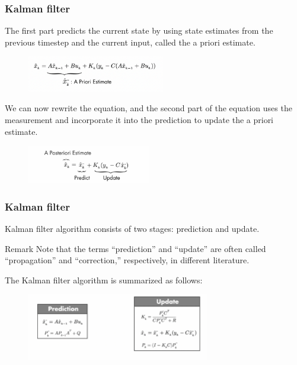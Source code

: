 \documentclass{beamer}
\begin{document}
\begin{frame}
	\frametitle{Kalman filter}
	The first part predicts the current state by using state estimates from the previous timestep and the current input, called the a priori estimate.
	\begin{figure}
		\centering
		\includegraphics[width=6cm]{kf_back4.png}
	\end{figure}
	We can now rewrite the equation, and the second part of the equation uses the measurement and incorporate it into the prediction to update the a priori estimate.
	\begin{figure}
		\centering
		\includegraphics[width=5.4cm]{kf_back5.png}
	\end{figure}

\end{frame}

\begin{frame}
	\frametitle{Kalman filter}
	Kalman filter algorithm consists of two stages: prediction and update. 
	\begin{block}{Remark}
		Note that the terms “prediction” and “update” are often called “propagation” and “correction,” respectively, in different literature. 
	\end{block}
	The Kalman filter algorithm is summarized as follows:
	\begin{figure}
		\centering
		\includegraphics[width=8cm]{kf.png}
	\end{figure}
\end{frame}
\end{document}
